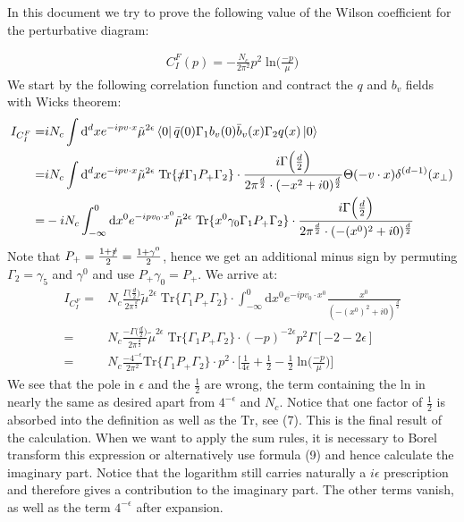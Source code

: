 \documentclass[openright,twoside,12pt,a4paper,final]{article}
\begin{document}
	\noindent
	In this document we try to prove the following value of the Wilson coefficient for the perturbative diagram:
	
	\begin{align}
		C_I^F (p) = -\frac{N_c}{2\pi^2} p^2 \;  \mathrm{ln}\big(\frac{-p}{\mu}\big)
	\end{align}
	\noindent	
	We start by the following correlation function and contract the $q$ and $b_v$ fields with Wicks theorem:
	\begin{align}
		I_{C^F_I} =& i N_c \int \mathrm{d}^d x e^{-ipv \cdot x} \tilde{\mu}^{2\epsilon} \bra{0} \bar{q}(0) \Gamma_1 b_v(0) \bar{b}_v(x) \Gamma_2 q(x) \ket{0} \nonumber \\ =& i N_c \int \mathrm{d}^d x e^{-ipv \cdot x} \tilde{\mu}^{2\epsilon} \;  \mathrm{Tr} \{\slashed{x} \Gamma_1 P_+ \Gamma_2\} \cdot \frac{i \Gamma\Big(\frac{d}{2}\Big)}{2 \pi^{\frac{d}{2}} \cdot (-x^2 + i0)^{\frac{d}{2}}} \Theta(-v \cdot x) \delta^{(d - 1)}(x_{\perp}) \nonumber \\ =& -i N_c \int_{-\infty}^{0} \mathrm{d} x^0 e^{-ipv_0 \cdot x^0} \tilde{\mu}^{2\epsilon} \;  \mathrm{Tr} \{x^0 \gamma_0 \Gamma_1 P_+ \Gamma_2\} \cdot \frac{i \Gamma\Big(\frac{d}{2}\Big)}{2 \pi^{\frac{d}{2}} \cdot (-(x^0)^2 + i0)^{\frac{d}{2}}} \nonumber
	\end{align}
	Note that $P_+ = \frac{1 + \slashed{v}}{2} = \frac{1 + \gamma^0}{2}$, hence we get an additional minus sign by permuting $\Gamma_2 = \gamma_5$ and $\gamma^0$ and use $P_+ \gamma_0 = P_+$. We arrive at:
	\begin{align}
		I_{C^F_I} =& N_c \frac{\Gamma\Big(\frac{d}{2}\Big)}{2 \pi^{\frac{d}{2}} }\tilde{\mu}^{2\epsilon} \; \mathrm{Tr} \{\Gamma_1 P_+ \Gamma_2\} \cdot \int_{-\infty}^{0} \mathrm{d} x^0 e^{-ipv_0 \cdot x^0}  \frac{x^0}{(-(x^0)^2 + i0)^{\frac{d}{2}}} \nonumber \\ =& N_c \frac{-\Gamma\Big(\frac{d}{2}\Big)}{2 \pi^{\frac{d}{2}} }\tilde{\mu}^{2\epsilon} \; \mathrm{Tr} \{\Gamma_1 P_+ \Gamma_2\} \cdot (-p)^{-2 \epsilon} p^2 \Gamma[-2 - 2\epsilon] \nonumber \\ =& N_c \frac{-4^{-\epsilon}}{2 \pi^2} \mathrm{Tr} \{\Gamma_1 P_+ \Gamma_2\} \cdot  p^2 \cdot  \Big[\frac{1}{4 \epsilon} + \frac{1}{2} - \frac{1}{2} \; \mathrm{ln} \big(\frac{-p}{\mu}\big)\Big]
	\end{align}
	We see that the pole in $\epsilon$ and the $\frac{1}{2}$ are wrong, the term containing the $\mathrm{ln}$ in nearly the same as desired apart from $4^{-\epsilon}$ and $N_c$. Notice that one factor of $\frac{1}{2}$ is absorbed into the definition as well as the $\mathrm{Tr}$, see (7). This is the final result of the calculation. When we want to apply the sum rules, it is necessary to Borel transform this expression or alternatively use formula (9) and hence calculate the imaginary part. Notice that the logarithm still carries naturally a $i \epsilon$ prescription and therefore gives a contribution to the imaginary part. The other terms vanish, as well as the term $4^{-\epsilon}$ after expansion. \\
\end{document}

